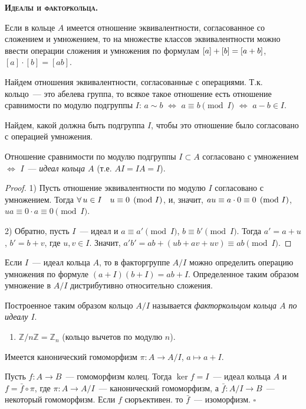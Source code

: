 \documentclass[a4paper]{article}
\newcommand*{\tema}[1]{\vspace{20pt}
\begin{center}{\textbf{\textsc{#1.}}}\vspace{5pt}
\end{center}}
\newcommand*{\p}[1]{#1\nobreak\discretionary{}{\hbox{$\mathsurround=0pt #1$}}{}}
\begin{document}
\tema{Идеалы и факторкольца}

Если в кольце $A$ имеется отношение эквивалентности, согласованное
со сложением и умножением, то на множестве классов эквивалентности
можно ввести операции сложения и умножения по формулам
$[a]+[b]\p=[a+b]$, $[a]\cdot[b]=[ab]$.

Найдем отношения эквивалентности, согласованные с операциями. Т.к.
кольцо~--- это абелева группа, то всякое такое отношение есть
отношение сравнимости по модулю подгруппы $I$: $a\sim b$
$\Leftrightarrow$ $a\equiv b\pmod{I}$ $\Leftrightarrow$ $a-b\in I$.

Найдем, какой должна быть подгруппа $I$, чтобы это отношение было
согласовано с операцией умножения.

\begin{theorem}
Отношение сравнимости по модулю подгруппы $I\subset A$ согласовано с
умножением $\Leftrightarrow$ $I$~--- \emph{идеал кольца $A$} (т.е.
$AI=IA=I$).
\end{theorem}

\begin{proof}
1) Пусть отношение эквивалентности по модулю $I$ согласовано с
умножением. Тогда $\forall \, u\in I\quad u\p\equiv 0\pmod{I}$, и,
значит, $au\p\equiv a\cdot 0\p\equiv0\pmod{I}$, $ua\equiv0\cdot
a\equiv0\pmod{I}$.

2) Обратно, пусть $I$~--- идеал и $a\equiv a'\pmod{I}$, $b\equiv
b'\pmod{I}$. Тогда $a'=a+u$, $b'=b+v$, где $u,v\in I$. Значит,
$a'b'=ab+(ub+av+uv)\equiv ab\pmod{I}$.
\end{proof}

Если $I$~--- идеал кольца $A$, то в факторгруппе $A/I$ можно
определить операцию умножения по формуле $(a+I)(b+I)=ab+I$.
Определенное таким образом умножение в $A/I$ дистрибутивно
относительно сложения.

Построенное таким образом кольцо $A/I$ называется
\emph{факторкольцом кольца $A$ по идеалу $I$}.

\prim
\begin{enumerate}
  \item $\mathbb{Z}/n\mathbb{Z}=\mathbb{Z}_n$ (кольцо вычетов по модулю
  $n$).
\end{enumerate}

Имеется канонический гомоморфизм $\pi\colon A\to A/I$, $a\mapsto
a+I$.

\begin{theorem}
Пусть $f\colon A\to B$~--- гомоморфизм колец. Тогда $\ker f=I$~---
идеал кольца $A$ и $f=\bar{f}\circ \pi$, где $\pi\colon A\to
A/I$~--- канонический гомоморфизм, а $\bar{f}\colon A/I\to B$~---
некоторый гомоморфизм. Если $f$ сюръективен. то $\bar{f}$~---
изоморфизм. $\square$
\end{theorem}
\end{document}
